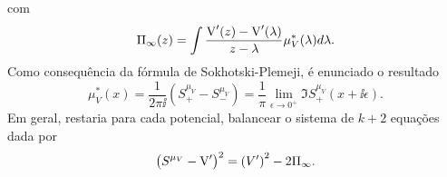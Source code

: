com $$\Pi_{\infty}(z) = \int \frac{\operatorname{V}'(z) - \operatorname{V}'(\lambda)}{z - \lambda} \mu^*_V(\lambda) d\lambda.$$ Como consequência da fórmula de Sokhotski-Plemeji, é enunciado o resultado 
\begin{equation}
	\mu^{*}_{V}(x) = \frac{1}{2\pi \ii} \left( S^{\mu_V}_{+} -  S^{\mu_V}_{-}\right) = \frac{1}{\pi} \lim_{\epsilon \to 0^+} \Im{S^{\mu_V}_{+}(x + \ii\epsilon)}.
	\label{Equation: p(lambda)}
\end{equation}
Em geral, restaria para cada potencial, balancear o sistema de $k+2$ equações dada por
\[
\left( S^{\mu_{V}} - \operatorname{V}' \right)^2 = \left( V' \right)^2 - 2 \Pi_{\infty}.
\]


